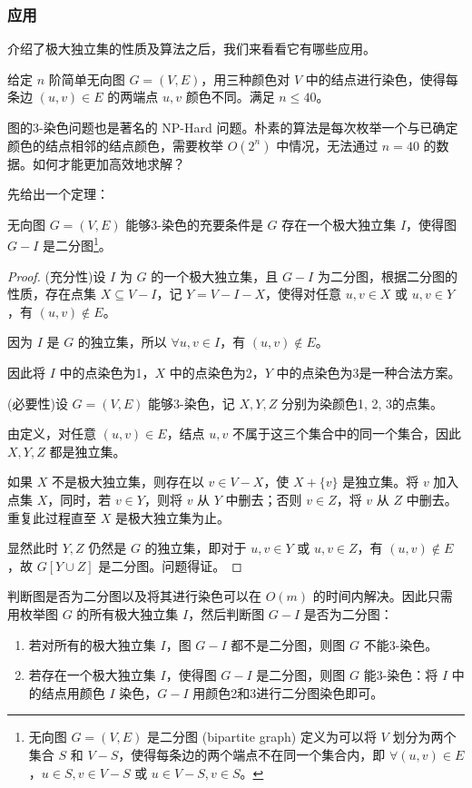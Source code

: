\documentclass[lang=cn,11pt,a4paper]{elegantpaper}
\begin{document}
\subsubsection{应用}
介绍了极大独立集的性质及算法之后，我们来看看它有哪些应用。

\begin{example}[图的3-染色问题]
    给定 $n$ 阶简单无向图 $G = (V, E)$，用三种颜色对 $V$ 中的结点进行染色，使得每条边 $(u, v) \in E$ 的两端点 $u, v$ 颜色不同。满足 $n \le 40$。
\end{example}

图的3-染色问题也是著名的 NP-Hard 问题。朴素的算法是每次枚举一个与已确定颜色的结点相邻的结点颜色，需要枚举 $O(2^n)$ 中情况，无法通过 $n = 40$ 的数据。如何才能更加高效地求解？

先给出一个定理：
\begin{theorem}
    无向图 $G=(V, E)$ 能够3-染色的充要条件是 $G$ 存在一个极大独立集 $I$，使得图 $G - I$ 是二分图\footnote{无向图 $G=(V, E)$ 是二分图 (bipartite graph) 定义为可以将 $V$ 划分为两个集合 $S$ 和 $V - S$，使得每条边的两个端点不在同一个集合内，即 $\forall (u, v) \in E$，$u \in S, v \in V - S$ 或 $u \in V - S, v \in S$。}。
\end{theorem}
\begin{proof}
    (充分性)设 $I$ 为 $G$ 的一个极大独立集，且 $G - I$ 为二分图，根据二分图的性质，存在点集 $X \subseteq V - I$，记 $Y = V - I - X$，使得对任意 $u, v \in X$ 或 $u, v \in Y$，有 $(u, v) \notin E$。

    因为 $I$ 是 $G$ 的独立集，所以 $\forall u, v \in I$，有 $(u, v) \notin E$。

    因此将 $I$ 中的点染色为1，$X$ 中的点染色为2，$Y$ 中的点染色为3是一种合法方案。

    (必要性)设 $G = (V, E)$ 能够3-染色，记 $X, Y, Z$ 分别为染颜色1, 2, 3的点集。

    由定义，对任意 $(u, v) \in E$，结点 $u, v$ 不属于这三个集合中的同一个集合，因此 $X, Y, Z$ 都是独立集。

    如果 $X$ 不是极大独立集，则存在以 $v \in V - X$，使 $X + \{v\}$ 是独立集。将 $v$ 加入点集 $X$，同时，若 $v \in Y$，则将 $v$ 从 $Y$ 中删去；否则 $v \in Z$，将 $v$ 从 $Z$ 中删去。重复此过程直至 $X$ 是极大独立集为止。

    显然此时 $Y, Z$ 仍然是 $G$ 的独立集，即对于 $u, v \in Y$ 或 $u, v \in Z$，有 $(u, v) \notin E$，故 $G[Y \cup Z]$ 是二分图。问题得证。
\end{proof}

判断图是否为二分图以及将其进行染色可以在 $O(m)$ 的时间内解决。因此只需用枚举图 $G$ 的所有极大独立集 $I$，然后判断图 $G - I$ 是否为二分图：
\begin{enumerate}
    \item 若对所有的极大独立集 $I$，图 $G - I$ 都不是二分图，则图 $G$ 不能3-染色。
    \item 若存在一个极大独立集 $I$，使得图 $G - I$ 是二分图，则图 $G$ 能3-染色：将 $I$ 中的结点用颜色 $I$ 染色，$G - I$ 用颜色2和3进行二分图染色即可。
\end{enumerate}
\end{document}
